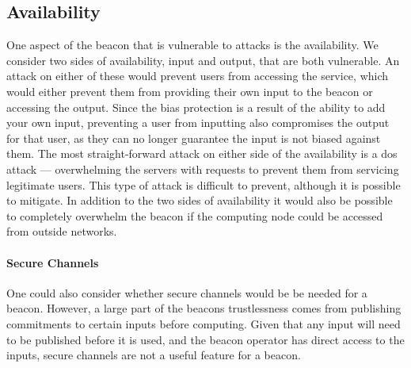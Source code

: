 \subsection{Availability}
One aspect of the beacon that is vulnerable to attacks is the availability. We consider two sides of availability, input and output, that are both vulnerable. An attack on either of these would prevent users from accessing the service, which would either prevent them from providing their own input to the beacon or accessing the output. Since the bias protection is a result of the ability to add your own input, preventing a user from inputting also compromises the output for that user, as they can no longer guarantee the input is not biased against them. 
The most straight-forward attack on either side of the availability is a \gls{dos} attack --- overwhelming the servers with requests to prevent them from servicing legitimate users. This type of attack is difficult to prevent, although it is possible to mitigate. %
In addition to the two sides of availability it would also be possible to completely overwhelm the beacon if the computing node could be accessed from outside networks. 

\paragraph{Secure Channels}
One could also consider whether secure channels would be be needed for a beacon. However, a large part of the beacons trustlessness comes from publishing commitments to certain inputs before computing. Given that any input will need to be published before it is used, and the beacon operator has direct access to the inputs, secure channels are not a useful feature for a beacon.
